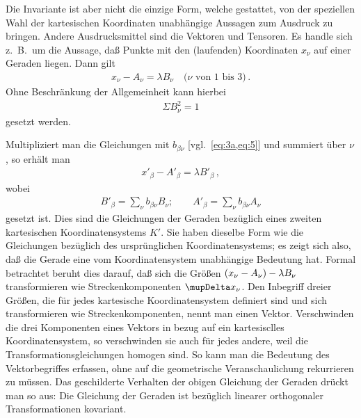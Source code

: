Die Invariante ist aber nicht die einzige Form, welche gestattet, von der 
speziellen Wahl der kartesischen Koordinaten unabhängige Aussagen zum Ausdruck
zu bringen. Andere Ausdrucksmittel sind die Vektoren und Tensoren. Es handle 
sich z.\ B.\ um die Aussage, daß Punkte mit den (laufenden) Koordinaten 
$x_{\nu}$ auf einer Geraden liegen. Dann gilt
\begin{align*}
x_{\nu} - A_{\nu} = \lambda B_{\nu}\quad \text{($\nu$ von $1$ bis $3$)}\, .
\end{align*}
Ohne Beschränkung der Allgemeinheit kann hierbei
\begin{align*}
\Sigma B_{\nu}^2 = 1
\end{align*}
gesetzt werden.

Multipliziert man die Gleichungen mit $b_{\beta\nu}$ [vgl.\ \cref{eq:3a,eq:5}] 
und summiert über $\nu$, so erhält man
\begin{align*}
x'_{\beta} - A'_{\beta} = \lambda B'_{\beta}\,,
\end{align*}
wobei
\begin{align*}
B'_{\beta} = \sum_{\nu} b_{\beta\nu} B_{\nu};\qquad
A'_{\beta} = \sum_{\nu} b_{\beta\nu} A_{\nu}
\end{align*}
gesetzt ist. Dies sind die Gleichungen der Geraden bezüglich eines zweiten 
kartesischen Koordinatensystems $K'$. Sie haben dieselbe Form wie die 
Gleichungen bezüglich des ursprünglichen Koordinatensystems; es zeigt sich 
also, daß die Gerade eine vom Koordinatensystem unabhängige Bedeutung hat. 
Formal betrachtet beruht dies darauf, daß sich die Größen ${\left(x_{\nu} - 
A_{\nu}\right)} - \lambda B_{\nu}$ transformieren wie Streckenkomponenten 
$\Dva x_{\nu}$. Den Inbegriff dreier Größen, die für jedes kartesische 
Koordinatensystem definiert sind und sich transformieren wie 
Streckenkomponenten, nennt man einen Vektor. Verschwinden die drei 
Komponenten eines Vektors in bezug auf ein kartesisclles Koordinatensystem, so 
verschwinden sie auch für jedes andere, weil die Transformationsgleichungen 
homogen sind. So kann man die Bedeutung des Vektorbegriffes erfassen, ohne auf 
die geometrische Veranschaulichung rekurrieren zu müssen. Das geschilderte 
Verhalten der obigen Gleichung der Geraden drückt man so aus: Die Gleichung 
der Geraden ist bezüglich linearer orthogonaler Transformationen kovariant.

